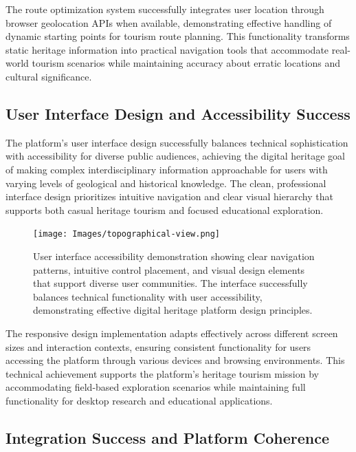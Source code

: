 The route optimization system successfully integrates user location through browser geolocation APIs when available, demonstrating effective handling of dynamic starting points for tourism route planning. This functionality transforms static heritage information into practical navigation tools that accommodate real-world tourism scenarios while maintaining accuracy about erratic locations and cultural significance.

\subsection{User Interface Design and Accessibility Success}
\label{subsec:user_interface_success}

The platform's user interface design successfully balances technical sophistication with accessibility for diverse public audiences, achieving the digital heritage goal of making complex interdisciplinary information approachable for users with varying levels of geological and historical knowledge. The clean, professional interface design prioritizes intuitive navigation and clear visual hierarchy that supports both casual heritage tourism and focused educational exploration.

\begin{figure}[htbp]
    \centering
    \texttt{[image: Images/topographical-view.png]}
    \caption{User interface accessibility demonstration showing clear navigation patterns, intuitive control placement, and visual design elements that support diverse user communities. The interface successfully balances technical functionality with user accessibility, demonstrating effective digital heritage platform design principles.}
    \label{fig:user_interface_accessibility}
\end{figure}

The responsive design implementation adapts effectively across different screen sizes and interaction contexts, ensuring consistent functionality for users accessing the platform through various devices and browsing environments. This technical achievement supports the platform's heritage tourism mission by accommodating field-based exploration scenarios while maintaining full functionality for desktop research and educational applications.

\subsection{Integration Success and Platform Coherence}
\label{subsec:integration_success}

